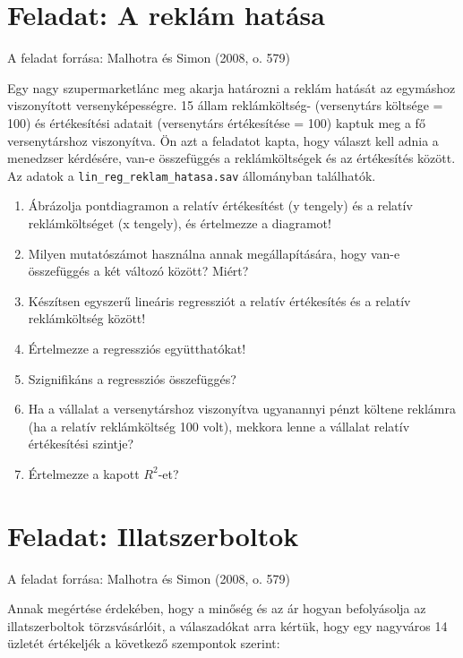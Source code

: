 \documentclass[
  letterpaper,
]{krantz}
\begin{document}
\hypertarget{feladat-a-rekluxe1m-hatuxe1sa}{%
\section{Feladat: A reklám hatása}\label{feladat-a-rekluxe1m-hatuxe1sa}}

A feladat forrása: Malhotra és Simon (2008, o. 579)

Egy nagy szupermarketlánc meg akarja határozni a reklám hatását az
egymáshoz viszonyított versenyképességre. 15 állam reklámköltség-
(versenytárs költsége = 100) és értékesítési adatait (versenytárs
értékesítése = 100) kaptuk meg a fő versenytárshoz viszonyítva. Ön azt a
feladatot kapta, hogy választ kell adnia a menedzser kérdésére, van-e
összefüggés a reklámköltségek és az értékesítés között. Az adatok a
\texttt{lin\_reg\_reklam\_hatasa.sav} állományban találhatók.

\begin{enumerate}
\def\labelenumi{\arabic{enumi}.}
\item
  Ábrázolja pontdiagramon a relatív értékesítést (y tengely) és a
  relatív reklámköltséget (x tengely), és értelmezze a diagramot!
\item
  Milyen mutatószámot használna annak megállapítására, hogy van-e
  összefüggés a két változó között? Miért?
\item
  Készítsen egyszerű lineáris regressziót a relatív értékesítés és a
  relatív reklámköltség között!
\item
  Értelmezze a regressziós együtthatókat!
\item
  Szignifikáns a regressziós összefüggés?
\item
  Ha a vállalat a versenytárshoz viszonyítva ugyanannyi pénzt költene
  reklámra (ha a relatív reklámköltség 100 volt), mekkora lenne a
  vállalat relatív értékesítési szintje?
\item
  Értelmezze a kapott \(R^2\)-et?
\end{enumerate}

\hypertarget{feladat-illatszerboltok}{%
\section{Feladat: Illatszerboltok}\label{feladat-illatszerboltok}}

A feladat forrása: Malhotra és Simon (2008, o. 579)

Annak megértése érdekében, hogy a minőség és az ár hogyan befolyásolja
az illatszerboltok törzsvásárlóit, a válaszadókat arra kértük, hogy egy
nagyváros 14 üzletét értékeljék a következő szempontok szerint:
\end{document}
